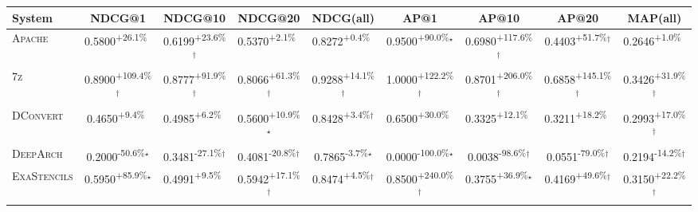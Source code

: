 \begin{table}[htbp]
\centering
\renewcommand{\arraystretch}{1.2}
\begin{tabular}{l|cccc|cccc}
\hline
System & NDCG@1 & NDCG@10 & NDCG@20 & NDCG(all) & AP@1 & AP@10 & AP@20 & MAP(all) \\ \hline
\textsc{Apache} & \cellcolor{green!30}0.5800\textsuperscript{+26.1\%}$^{\,\,\,}$ & \cellcolor{green!30}0.6199\textsuperscript{+23.6\%}$^\dagger$ & \cellcolor{green!30}0.5370\textsuperscript{+2.1\%}$^{\,\,\,}$ & \cellcolor{green!30}0.8272\textsuperscript{+0.4\%}$^{\,\,\,}$ & \cellcolor{green!30}0.9500\textsuperscript{+90.0\%}$^\star$ & \cellcolor{green!30}0.6980\textsuperscript{+117.6\%}$^\dagger$ & \cellcolor{green!30}0.4403\textsuperscript{+51.7\%}$^\dagger$ & \cellcolor{green!30}0.2646\textsuperscript{+1.0\%}$^{\,\,\,}$ \\
\textsc{7z} & \cellcolor{green!30}0.8900\textsuperscript{+109.4\%}$^\dagger$ & \cellcolor{green!30}0.8777\textsuperscript{+91.9\%}$^\dagger$ & \cellcolor{green!30}0.8066\textsuperscript{+61.3\%}$^\dagger$ & \cellcolor{green!30}0.9288\textsuperscript{+14.1\%}$^\dagger$ & \cellcolor{green!30}1.0000\textsuperscript{+122.2\%}$^\dagger$ & \cellcolor{green!30}0.8701\textsuperscript{+206.0\%}$^\dagger$ & \cellcolor{green!30}0.6858\textsuperscript{+145.1\%}$^\dagger$ & \cellcolor{green!30}0.3426\textsuperscript{+31.9\%}$^\dagger$ \\
\textsc{DConvert} & \cellcolor{green!30}0.4650\textsuperscript{+9.4\%}$^{\,\,\,}$ & \cellcolor{green!30}0.4985\textsuperscript{+6.2\%}$^{\,\,\,}$ & \cellcolor{green!30}0.5600\textsuperscript{+10.9\%}$^\star$ & \cellcolor{green!30}0.8428\textsuperscript{+3.4\%}$^\dagger$ & \cellcolor{green!30}0.6500\textsuperscript{+30.0\%}$^{\,\,\,}$ & \cellcolor{green!30}0.3325\textsuperscript{+12.1\%}$^{\,\,\,}$ & \cellcolor{green!30}0.3211\textsuperscript{+18.2\%}$^{\,\,\,}$ & \cellcolor{green!30}0.2993\textsuperscript{+17.0\%}$^\dagger$ \\
\textsc{DeepArch} & \cellcolor{red!30}0.2000\textsuperscript{-50.6\%}$^\star$ & \cellcolor{red!30}0.3481\textsuperscript{-27.1\%}$^\dagger$ & \cellcolor{red!30}0.4081\textsuperscript{-20.8\%}$^\dagger$ & \cellcolor{red!30}0.7865\textsuperscript{-3.7\%}$^\star$ & \cellcolor{red!30}0.0000\textsuperscript{-100.0\%}$^\star$ & \cellcolor{red!30}0.0038\textsuperscript{-98.6\%}$^\dagger$ & \cellcolor{red!30}0.0551\textsuperscript{-79.0\%}$^\dagger$ & \cellcolor{red!30}0.2194\textsuperscript{-14.2\%}$^\dagger$ \\
\textsc{ExaStencils} & \cellcolor{green!30}0.5950\textsuperscript{+85.9\%}$^\star$ & \cellcolor{green!30}0.4991\textsuperscript{+9.5\%}$^{\,\,\,}$ & \cellcolor{green!30}0.5942\textsuperscript{+17.1\%}$^\dagger$ & \cellcolor{green!30}0.8474\textsuperscript{+4.5\%}$^\dagger$ & \cellcolor{green!30}0.8500\textsuperscript{+240.0\%}$^\dagger$ & \cellcolor{green!30}0.3755\textsuperscript{+36.9\%}$^\star$ & \cellcolor{green!30}0.4169\textsuperscript{+49.6\%}$^\dagger$ & \cellcolor{green!30}0.3150\textsuperscript{+22.2\%}$^\dagger$ \\

\end{tabular}
\end{table}
